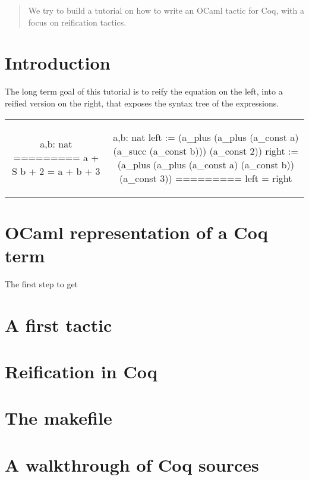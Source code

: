\documentclass[a4]{article}
\makeatletter
\newenvironment{twolistings}%
{\noindent\begin{tabular*}{\linewidth}{@{}c@{\extracolsep{\fill}}c@{}}}%
{\end{tabular*}}
\makeatother
\begin{document}
\begin{abstract}
  We try to build a tutorial on how to write an OCaml tactic for Coq,
  with a focus on reification tactics.
\end{abstract}

\section*{Introduction}
The long term goal of this tutorial is to reify the equation on the
left, into a reified version on the right, that exposes the syntax
tree of the expressions.

\begin{twolistings}
  \begin{coq}


a,b: nat
========= 
a + S b + 2 = a + b + 3
  \end{coq}
&
  \begin{coq}
a,b: nat
left := (a_plus (a_plus (a_const a) (a_succ (a_const b))) (a_const 2))
right := (a_plus (a_plus (a_const a) (a_const b)) (a_const 3))
========= 
left  = right
  \end{coq}

\end{twolistings}
\section{OCaml representation of a Coq term}
The first step to get 
\begin{coq}
  
\end{coq}
\section{A first tactic}
\section{Reification in Coq}

\appendix
\section{The makefile}
\section{A walkthrough of Coq sources}
\end{document}
